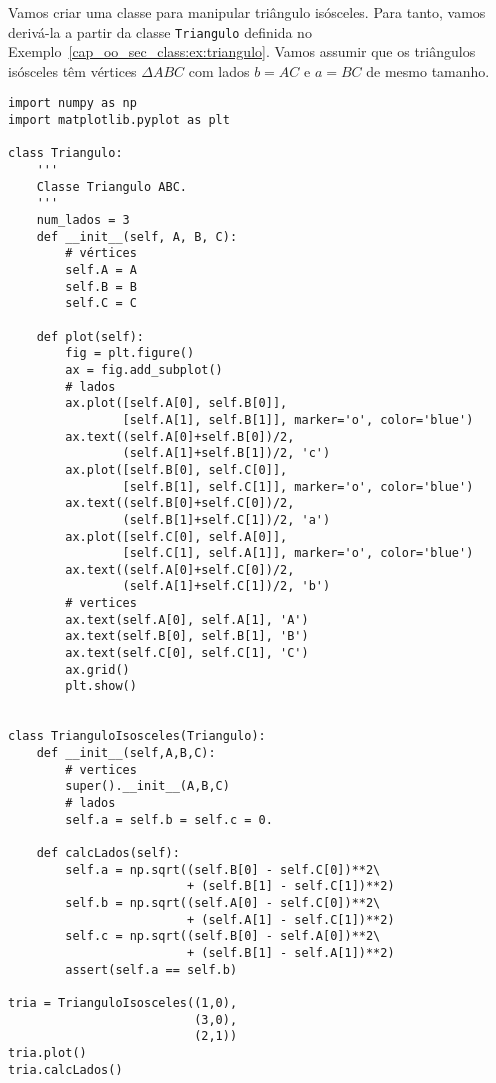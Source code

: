 \begin{ex}
  Vamos criar uma classe para manipular triângulo isósceles. Para tanto, vamos derivá-la a partir da classe \lstinline+Triangulo+ definida no Exemplo~\ref{cap_oo_sec_class:ex:triangulo}. Vamos assumir que os triângulos isósceles têm vértices $\Delta ABC$ com lados $b = AC$ e $a = BC$ de mesmo tamanho.

\begin{lstlisting}[caption=classTrianguloIsosceles.py, label=cap_oo_sec_her:cod:classTrianguloIsosceles]
import numpy as np
import matplotlib.pyplot as plt

class Triangulo:
    '''
    Classe Triangulo ABC.
    '''
    num_lados = 3
    def __init__(self, A, B, C):
        # vértices
        self.A = A
        self.B = B
        self.C = C

    def plot(self):
        fig = plt.figure()
        ax = fig.add_subplot()
        # lados
        ax.plot([self.A[0], self.B[0]],
                [self.A[1], self.B[1]], marker='o', color='blue')
        ax.text((self.A[0]+self.B[0])/2,
                (self.A[1]+self.B[1])/2, 'c')
        ax.plot([self.B[0], self.C[0]],
                [self.B[1], self.C[1]], marker='o', color='blue')
        ax.text((self.B[0]+self.C[0])/2,
                (self.B[1]+self.C[1])/2, 'a')
        ax.plot([self.C[0], self.A[0]],
                [self.C[1], self.A[1]], marker='o', color='blue')
        ax.text((self.A[0]+self.C[0])/2,
                (self.A[1]+self.C[1])/2, 'b')
        # vertices
        ax.text(self.A[0], self.A[1], 'A')
        ax.text(self.B[0], self.B[1], 'B')
        ax.text(self.C[0], self.C[1], 'C')
        ax.grid()
        plt.show()


class TrianguloIsosceles(Triangulo):
    def __init__(self,A,B,C):
        # vertices
        super().__init__(A,B,C)
        # lados
        self.a = self.b = self.c = 0.

    def calcLados(self):
        self.a = np.sqrt((self.B[0] - self.C[0])**2\
                         + (self.B[1] - self.C[1])**2)
        self.b = np.sqrt((self.A[0] - self.C[0])**2\
                         + (self.A[1] - self.C[1])**2)
        self.c = np.sqrt((self.B[0] - self.A[0])**2\
                         + (self.B[1] - self.A[1])**2)
        assert(self.a == self.b)

tria = TrianguloIsosceles((1,0),
                          (3,0),
                          (2,1))
tria.plot()
tria.calcLados()
\end{lstlisting}

\end{ex}

